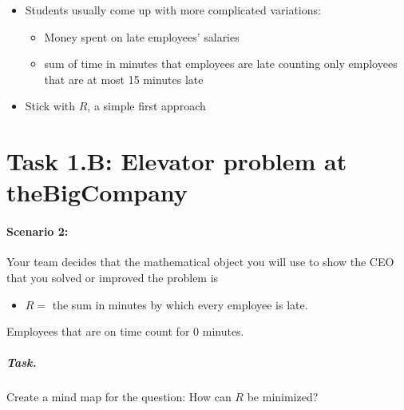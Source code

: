%






\newpage

\begin{annotation}
	\begin{notes}
	\begin{itemize}
		\item Students usually come up with more complicated variations:
		\begin{itemize}
			\item Money spent on late employees' salaries
			\item sum of time in minutes that employees are late counting only employees that are at most 15 minutes late
		\end{itemize}
		\item Stick with $R$, a simple first approach
	\end{itemize}	
	\end{notes}
	
\end{annotation}

\section*{Task 1.B: Elevator problem at theBigCompany}


\paragraph{Scenario 2:} \label{elevatorR}

Your team decides that the mathematical object you will use to show the CEO that you solved or improved the problem is
\begin{itemize}
	\item $R=$ the sum in minutes by which every employee is late.
\end{itemize}

Employees that are on time count for 0 minutes. 

\subparagraph{Task.} Create a mind map for the question: \quad How can $R$ be minimized?


\vfill

\question

